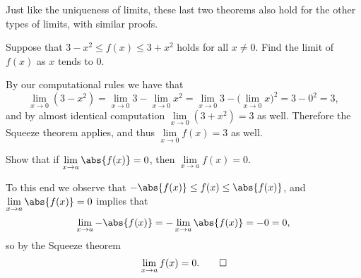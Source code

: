 \begin{remark}
	Just like the uniqueness of limits, these last two theorems also hold for the other types of limits, with similar proofs.
\end{remark}

\begin{example}
	Suppose that $3 - x^2 \leq f(x) \leq 3 + x^2$ holds for all $x \neq 0$.
	Find the limit of $f(x)$ as $x$ tends to $0$.

	By our computational rules we have that
	\[
		\lim_{x \to 0} (3 - x^2) = \lim_{x \to 0} 3 - \lim_{x \to 0} x^2 = \lim_{x \to 0} 3 - \big ( \lim_{x \to 0} x \big )^2 = 3 - 0^2 = 3,
	\]
	and by almost identical computation $\lim\limits_{x \to 0} (3 + x^2) = 3$ as well. Therefore the Squeeze theorem applies, and thus $\lim\limits_{x \to 0} f(x) = 3$ as well.
\end{example}

\begin{example}
	Show that if $\lim\limits_{x \to a} \abs{f(x)} = 0$, then $\lim\limits_{x \to a} f(x) = 0$.

	To this end we observe that $-\abs{f(x)} \leq f(x) \leq \abs{f(x)}$, and $\lim\limits_{x \to a} \abs{f(x)} = 0$ implies that
	\[
		\lim_{x \to a} - \abs{f(x)} = - \lim_{x \to a} \abs{f(x)} = - 0 = 0,
	\]
	so by the Squeeze theorem
	\[
		\lim_{x \to a} f(x) = 0. \qedhere
	\]
\end{example}
